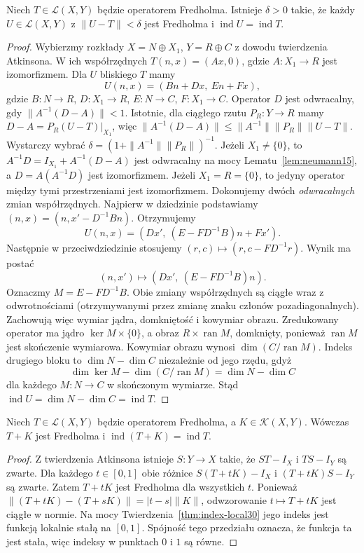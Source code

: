 \begin{twierdzenie}
\label{thm:index-local30}
Niech $T\in\mathcal L(X,Y)$ będzie operatorem Fredholma.
Istnieje $\delta>0$ takie, że każdy $U\in\mathcal L(X,Y)$
z $\|U-T\|<\delta$ jest Fredholma i
$\operatorname{ind}U=\operatorname{ind}T$.
\end{twierdzenie}
\begin{proof}
Wybierzmy rozkłady $X=N\oplus X_1$, $Y=R\oplus C$
z dowodu twierdzenia Atkinsona. W ich współrzędnych
$T(n,x)=(Ax,0)$, gdzie $A:X_1\to R$ jest izomorfizmem.
Dla $U$ bliskiego $T$ mamy
\[U(n,x)=(Bn+Dx,\ En+Fx),\]
gdzie $B:N\to R$, $D:X_1\to R$, $E:N\to C$,
$F:X_1\to C$. Operator $D$ jest odwracalny, gdy
$\|A^{-1}(D-A)\|<1$. Istotnie, dla ciągłego rzutu
$P_R:Y\to R$ mamy $D-A=P_R(U-T)|_{X_1}$, więc
$\|A^{-1}(D-A)\|\le\|A^{-1}\|\|P_R\|\|U-T\|$.
Wystarczy wybrać
$\delta=(1+\|A^{-1}\|\|P_R\|)^{-1}$.
Jeżeli $X_1\ne\{0\}$, to
$A^{-1}D=I_{X_1}+A^{-1}(D-A)$ jest odwracalny na mocy
Lematu~\ref{lem:neumann15}, a $D=A(A^{-1}D)$ jest
izomorfizmem. Jeżeli $X_1=R=\{0\}$, to jedyny operator
między tymi przestrzeniami jest izomorfizmem.
Dokonujemy dwóch \emph{odwracalnych} zmian współrzędnych.
Najpierw w dziedzinie podstawiamy
$(n,x)=(n,x'-D^{-1}Bn)$. Otrzymujemy
\[U(n,x)=(Dx',\ (E-FD^{-1}B)n+Fx').\]
Następnie w przeciwdziedzinie stosujemy
$(r,c)\mapsto(r,c-FD^{-1}r)$. Wynik ma postać
\[(n,x')\mapsto(Dx',\ (E-FD^{-1}B)n).\]
Oznaczmy $M=E-FD^{-1}B$. Obie zmiany współrzędnych
są ciągłe wraz z odwrotnościami (otrzymywanymi przez
zmianę znaku członów pozadiagonalnych). Zachowują więc
wymiar jądra, domkniętość i kowymiar obrazu.
Zredukowany operator ma jądro $\ker M\times\{0\}$,
a obraz $R\times\operatorname{ran}M$, domknięty, ponieważ
$\operatorname{ran}M$ jest skończenie wymiarowa.
Kowymiar obrazu wynosi $\dim(C/\operatorname{ran}M)$.
Indeks drugiego bloku to
$\dim N-\dim C$ niezależnie od jego rzędu, gdyż
\[\dim\ker M-\dim(C/\operatorname{ran}M)=\dim N-\dim C\]
dla każdego $M:N\to C$ w skończonym wymiarze.
Stąd $\operatorname{ind}U=\dim N-\dim C=\operatorname{ind}T$.
\end{proof}

\begin{twierdzenie}
\label{thm:index-compact-perturb30}
Niech $T\in\mathcal L(X,Y)$ będzie operatorem Fredholma,
a $K\in\mathcal K(X,Y)$. Wówczas $T+K$ jest Fredholma i
$\operatorname{ind}(T+K)=\operatorname{ind}T$.
\end{twierdzenie}
\begin{proof}
Z twierdzenia Atkinsona istnieje $S:Y\to X$ takie, że
$ST-I_X$ i $TS-I_Y$ są zwarte. Dla każdego $t\in[0,1]$
obie różnice $S(T+tK)-I_X$ i $(T+tK)S-I_Y$ są zwarte.
Zatem $T+tK$ jest Fredholma dla wszystkich $t$.
Ponieważ $\|(T+tK)-(T+sK)\|=|t-s|\|K\|$,
odwzorowanie $t\mapsto T+tK$ jest ciągłe w normie.
Na mocy Twierdzenia~\ref{thm:index-local30} jego indeks
jest funkcją lokalnie stałą na $[0,1]$. Spójność tego
przedziału oznacza, że funkcja ta jest stała, więc
indeksy w punktach $0$ i $1$ są równe.
\end{proof}

